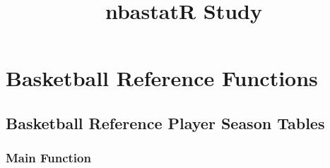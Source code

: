 \documentclass[]{article}
\title{nbastatR Study}
\author{}
\date{}
\begin{document}
\maketitle

\section{Basketball Reference
Functions}\label{basketball-reference-functions}

\subsection{Basketball Reference Player Season
Tables}\label{basketball-reference-player-season-tables}

\subsubsection{Main Function}\label{main-function}
\end{document}
